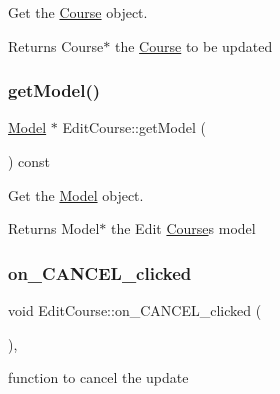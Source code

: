 Get the \hyperlink{classCourse}{Course} object. 

\begin{DoxyReturn}{Returns}
Course$\ast$ the \hyperlink{classCourse}{Course} to be updated 
\end{DoxyReturn}
\mbox{\label{classEditCourse_a6c26566b7caaf2f44192bfc47b71212d}} 
\subsubsection{\texorpdfstring{get\+Model()}{getModel()}}
{\footnotesize\ttfamily \hyperlink{classModel}{Model} $\ast$ Edit\+Course\+::get\+Model (\begin{DoxyParamCaption}{ }\end{DoxyParamCaption}) const}



Get the \hyperlink{classModel}{Model} object. 

\begin{DoxyReturn}{Returns}
Model$\ast$ the Edit \hyperlink{classCourse}{Course}\textquotesingle{}s model 
\end{DoxyReturn}
\mbox{\label{classEditCourse_a8cea0aa3e8f43d6a9aa3260e97e7713e}} 
\subsubsection{\texorpdfstring{on\+\_\+\+C\+A\+N\+C\+E\+L\+\_\+clicked}{on\_CANCEL\_clicked}}
{\footnotesize\ttfamily void Edit\+Course\+::on\+\_\+\+C\+A\+N\+C\+E\+L\+\_\+clicked (\begin{DoxyParamCaption}{ }\end{DoxyParamCaption})\hspace{0.3cm}{\ttfamily [private]}, {\ttfamily [slot]}}



function to cancel the update 

\mbox{\label{classEditCourse_ae625c52f7558677c52ad62face57d349}} 
